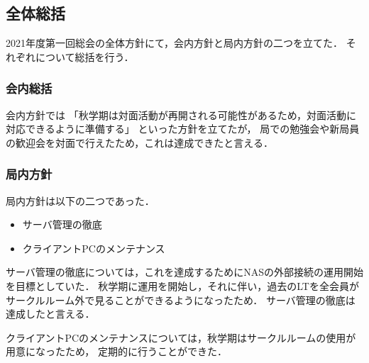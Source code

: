 \subsection*{全体総括}


2021年度第一回総会の全体方針にて，会内方針と局内方針の二つを立てた．
それぞれについて総括を行う．

\subsubsection*{会内総括}
会内方針では
「秋学期は対面活動が再開される可能性があるため，対面活動に対応できるように準備する」
といった方針を立てたが，
局での勉強会や新局員の歓迎会を対面で行えたため，これは達成できたと言える．

\subsubsection*{局内方針}

局内方針は以下の二つであった．
\begin{itemize}
    \item サーバ管理の徹底
    \item クライアントPCのメンテナンス
\end{itemize}

サーバ管理の徹底については，これを達成するためにNASの外部接続の運用開始を目標としていた．
秋学期に運用を開始し，それに伴い，過去のLTを全会員がサークルルーム外で見ることができるようになったため．
サーバ管理の徹底は達成したと言える．

クライアントPCのメンテナンスについては，秋学期はサークルルームの使用が用意になったため，
定期的に行うことができた．
